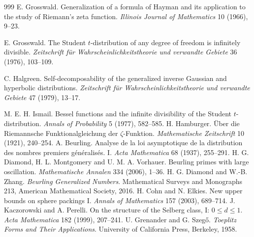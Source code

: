 \begin{thebibliography}{999}
 E. Grosswald. Generalization of a formula of Hayman and its application to the study of Riemann's zeta function. \emph{Illinois Journal of Mathematics} 10 (1966), 9--23.

 E. Grosswald. The Student $t$-distribution of any degree of freedom is infinitely divisible. \emph{Zeitschrift f\"ur Wahrscheinlichkeitstheorie und verwandte Gebiete} 36 (1976), 103--109.

 C. Halgreen. Self-decomposability of the generalized inverse Gaussian and hyperbolic distributions. \emph{Zeitschrift f\"ur Wahrscheinlichkeitstheorie und verwandte Gebiete} 47 (1979), 13--17.

 M. E. H. Ismail. Bessel functions and the infinite divisibility of the Student $t$-distribution. \emph{Annals of Probability} 5 (1977), 582--585.
 H. Hamburger. \"Uber die Riemannsche Funktionalgleichung der $\zeta$-Funktion. \emph{Mathematische Zeitschrift} 10 (1921), 240--254. %
 A. Beurling. Analyse de la loi asymptotique de la distribution des nombres premiers g\'en\'eralis\'es. I. \emph{Acta Mathematica} 68 (1937), 255--291. %
 H. G. Diamond, H. L. Montgomery and U. M. A. Vorhauer. Beurling primes with large oscillation. \emph{Mathematische Annalen} 334 (2006), 1--36. %
 H. G. Diamond and W.-B. Zhang. \emph{Beurling Generalized Numbers}. Mathematical Surveys and Monographs 213, American Mathematical Society, 2016. %
 H. Cohn and N. Elkies. New upper bounds on sphere packings I. \emph{Annals of Mathematics} 157 (2003), 689--714. %
 J. Kaczorowski and A. Perelli. On the structure of the Selberg class, I: $0\le d\le1$. \emph{Acta Mathematica} 182 (1999), 207--241. %
 U. Grenander and G. Szeg\H o. \emph{Toeplitz Forms and Their Applications}. University of California Press, Berkeley, 1958. %
\end{thebibliography}

